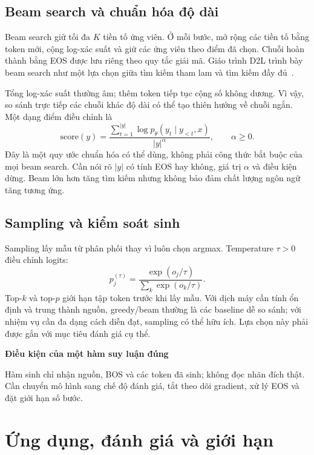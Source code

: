 \documentclass[11pt,a4paper]{article}
\numberwithin{equation}{section}
\newcommand{\notebox}[2]{\par\smallskip\noindent
  \begingroup\setlength{\fboxsep}{10pt}\colorbox{PaleBlue}{%
  \parbox{\dimexpr\linewidth-20pt\relax}{\textbf{\color{ReportBlue}#1}\par\smallskip #2}}%
  \endgroup\par\smallskip}
\begin{document}
\subsection{Beam search và chuẩn hóa độ dài}
Beam search giữ tối đa $K$ tiền tố ứng viên. Ở mỗi bước, mở rộng các tiền tố bằng token mới, cộng log-xác suất và giữ các ứng viên theo điểm đã chọn. Chuỗi hoàn thành bằng EOS được lưu riêng theo quy tắc giải mã. Giáo trình D2L trình bày beam search như một lựa chọn giữa tìm kiếm tham lam và tìm kiếm đầy đủ~\cite{d2lbeam}.

Tổng log-xác suất thường âm; thêm token tiếp tục cộng số không dương. Vì vậy, so sánh trực tiếp các chuỗi khác độ dài có thể tạo thiên hướng về chuỗi ngắn. Một dạng điểm điều chỉnh là
\begin{equation}
\mathrm{score}(y)=\frac{\sum_{t=1}^{|y|}\log p_\theta(y_t\mid y_{<t},x)}{|y|^\alpha},
\qquad \alpha\geq0.
\end{equation}
Đây là một quy ước chuẩn hóa có thể dùng, không phải công thức bắt buộc của mọi beam search. Cần nói rõ $|y|$ có tính EOS hay không, giá trị $\alpha$ và điều kiện dừng. Beam lớn hơn tăng tìm kiếm nhưng không bảo đảm chất lượng ngôn ngữ tăng tương ứng.

\subsection{Sampling và kiểm soát sinh}
Sampling lấy mẫu từ phân phối thay vì luôn chọn argmax. Temperature $\tau>0$ điều chỉnh logits:
\begin{equation}
p_j^{(\tau)}=\frac{\exp(o_j/\tau)}{\sum_k\exp(o_k/\tau)}.
\end{equation}
Top-$k$ và top-$p$ giới hạn tập token trước khi lấy mẫu. Với dịch máy cần tính ổn định và trung thành nguồn, greedy/beam thường là các baseline dễ so sánh; với nhiệm vụ cần đa dạng cách diễn đạt, sampling có thể hữu ích. Lựa chọn này phải được gắn với mục tiêu đánh giá cụ thể.

\notebox{Điều kiện của một hàm suy luận đúng}{Hàm sinh chỉ nhận nguồn, BOS và các token đã sinh; không đọc nhãn đích thật. Cần chuyển mô hình sang chế độ đánh giá, tắt theo dõi gradient, xử lý EOS và đặt giới hạn số bước.}

\clearpage
\section{Ứng dụng, đánh giá và giới hạn}
\end{document}
